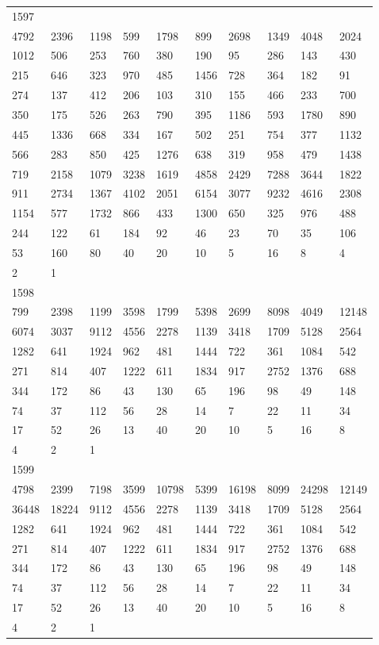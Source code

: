 \begin{longtable}{*{10}{l}}
1597&&&&&&&&&\\
4792& 2396& 1198& 599& 1798& 899& 2698& 1349& 4048& 2024\\
1012& 506& 253& 760& 380& 190& 95& 286& 143& 430\\
215& 646& 323& 970& 485& 1456& 728& 364& 182& 91\\
274& 137& 412& 206& 103& 310& 155& 466& 233& 700\\
350& 175& 526& 263& 790& 395& 1186& 593& 1780& 890\\
445& 1336& 668& 334& 167& 502& 251& 754& 377& 1132\\
566& 283& 850& 425& 1276& 638& 319& 958& 479& 1438\\
719& 2158& 1079& 3238& 1619& 4858& 2429& 7288& 3644& 1822\\
911& 2734& 1367& 4102& 2051& 6154& 3077& 9232& 4616& 2308\\
1154& 577& 1732& 866& 433& 1300& 650& 325& 976& 488\\
244& 122& 61& 184& 92& 46& 23& 70& 35& 106\\
53& 160& 80& 40& 20& 10& 5& 16& 8& 4\\
2& 1& \\

1598&&&&&&&&&\\
799& 2398& 1199& 3598& 1799& 5398& 2699& 8098& 4049& 12148\\
6074& 3037& 9112& 4556& 2278& 1139& 3418& 1709& 5128& 2564\\
1282& 641& 1924& 962& 481& 1444& 722& 361& 1084& 542\\
271& 814& 407& 1222& 611& 1834& 917& 2752& 1376& 688\\
344& 172& 86& 43& 130& 65& 196& 98& 49& 148\\
74& 37& 112& 56& 28& 14& 7& 22& 11& 34\\
17& 52& 26& 13& 40& 20& 10& 5& 16& 8\\
4& 2& 1& \\

1599&&&&&&&&&\\
4798& 2399& 7198& 3599& 10798& 5399& 16198& 8099& 24298& 12149\\
36448& 18224& 9112& 4556& 2278& 1139& 3418& 1709& 5128& 2564\\
1282& 641& 1924& 962& 481& 1444& 722& 361& 1084& 542\\
271& 814& 407& 1222& 611& 1834& 917& 2752& 1376& 688\\
344& 172& 86& 43& 130& 65& 196& 98& 49& 148\\
74& 37& 112& 56& 28& 14& 7& 22& 11& 34\\
17& 52& 26& 13& 40& 20& 10& 5& 16& 8\\
4& 2& 1& \\


\end{longtable}
